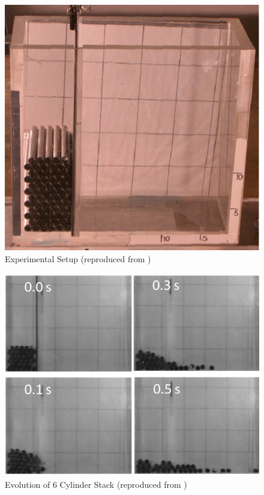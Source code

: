 \begin{figure}[htb!]
\centering
\setlength\fboxsep{0pt}
      \includegraphics[scale=0.3]{figures/exp_setup.png} 
\caption{{\small{Experimental Setup (reproduced from \cite{zhang})}}}
\label{fig:exp_setup}
\end{figure}

\begin{figure}[htb!]
\centering
\setlength\fboxsep{0pt}
      \includegraphics[scale=0.3]{figures/sysEvol.png} 
\caption{{\small{Evolution of 6 Cylinder Stack (reproduced from \cite{zhang})}}}
\label{fig:sys_state}
\end{figure}

